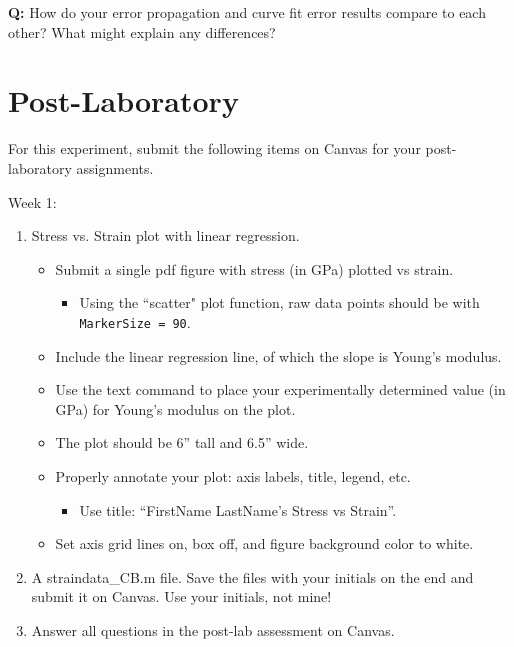 \documentclass{article} %
\begin{document}
\textbf{Q:} How do your error propagation and curve fit error results compare to each other? What might explain any differences?\\



\section{Post-Laboratory}
For this experiment, submit the following items on Canvas for your post-laboratory assignments.

Week 1:
\begin{enumerate}
    \item Stress vs. Strain plot with linear regression. 
    \begin{itemize}
        \item Submit a single pdf figure with stress (in GPa) plotted vs strain.
        \begin{itemize}
            \item Using the ``scatter" plot function, raw data points should be with \texttt{MarkerSize = 90}.
        \end{itemize}
        \item Include the linear regression line, of which the slope is Young’s modulus.
        \item Use the text command to place your experimentally determined value (in GPa) for Young’s modulus on the plot.
        \item The plot should be 6'' tall and 6.5'' wide.
        \item Properly annotate your plot: axis labels, title, legend, etc.
        \begin{itemize}
            \item Use title: ``FirstName LastName's Stress vs Strain''.
        \end{itemize}
        \item Set axis grid lines on, box off, and figure background color to white.
    \end{itemize}
    \item A straindata\_CB.m file. Save the files with your initials on the end and submit it on Canvas. Use your initials, not mine!
    \item Answer all questions in the post-lab assessment on Canvas.
\end{enumerate}
\end{document}
